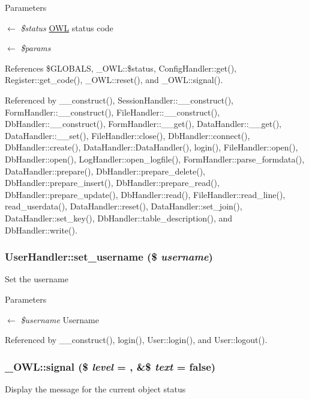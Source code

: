 \begin{DoxyParams}{Parameters}
\item[\mbox{$\leftarrow$} {\em \$status}]\hyperlink{classOWL}{OWL} status code \item[\mbox{$\leftarrow$} {\em \$params}]\end{DoxyParams}


References \$GLOBALS, \_\-OWL::\$status, ConfigHandler::get(), Register::get\_\-code(), \_\-OWL::reset(), and \_\-OWL::signal().



Referenced by \_\-\_\-construct(), SessionHandler::\_\-\_\-construct(), FormHandler::\_\-\_\-construct(), FileHandler::\_\-\_\-construct(), DbHandler::\_\-\_\-construct(), FormHandler::\_\-\_\-get(), DataHandler::\_\-\_\-get(), DataHandler::\_\-\_\-set(), FileHandler::close(), DbHandler::connect(), DbHandler::create(), DataHandler::DataHandler(), login(), FileHandler::open(), DbHandler::open(), LogHandler::open\_\-logfile(), FormHandler::parse\_\-formdata(), DataHandler::prepare(), DbHandler::prepare\_\-delete(), DbHandler::prepare\_\-insert(), DbHandler::prepare\_\-read(), DbHandler::prepare\_\-update(), DbHandler::read(), FileHandler::read\_\-line(), read\_\-userdata(), DataHandler::reset(), DataHandler::set\_\-join(), DataHandler::set\_\-key(), DbHandler::table\_\-description(), and DbHandler::write().

\subsubsection[{set\_\-username}]{\setlength{\rightskip}{0pt plus 5cm}UserHandler::set\_\-username (\$ {\em username})}\label{classUserHandler_afbcc9a275b547cca0bd4cff567b054a0}
Set the username 
\begin{DoxyParams}{Parameters}
\item[\mbox{$\leftarrow$} {\em \$username}]Username \end{DoxyParams}


Referenced by \_\-\_\-construct(), login(), User::login(), and User::logout().

\subsubsection[{signal}]{\setlength{\rightskip}{0pt plus 5cm}\_\-OWL::signal (\$ {\em level} = {}, \/  \&\$ {\em text} = {\ttfamily false})}\label{class__OWL_a51ba4a16409acf2a2f61f286939091a5}
Display the message for the current object status



